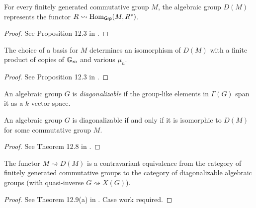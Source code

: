 \begin{proposition}
  \label{DM_func}

  For every finitely generated commutative group $M$, the algebraic group $D(M)$
  represents the functor $R \rightsquigarrow \operatorname{Hom}_{\mathsf{Grp}}(M,R^*)$.
\end{proposition}
\begin{proof}
  See Proposition 12.3 in \cite{Milne_2017}.
\end{proof}


\begin{proposition}
  \label{0-spec-grp-alg-basis}

  The choice of a basis for $M$ determines an isomorphism of $D(M)$
  with a finite product of copies of ${\mathbb G_m}$ and various $\mu_n$.
\end{proposition}
\begin{proof}
  See Proposition 12.3 in \cite{Milne_2017}.
\end{proof}


\begin{definition}
  \label{diag}
  An algebraic group $G$ is \emph{diagonalizable}
  if the group-like elements in $\Gamma(G)$ span it as a $k$-vector space.
\end{definition}

\begin{theorem}
  \label{diag_iff_D}
  An algebraic group $G$ is diagonalizable
  if and only if it is isomorphic to $D(M)$ for some commutative group $M$.
\end{theorem}
\begin{proof}
  See Theorem 12.8 in \cite{Milne_2017}.
\end{proof}

\begin{theorem}
  \label{congr_fggrp_diag}
  The functor $M\rightsquigarrow D(M)$ is a contravariant equivalence
  from the category of finitely generated commutative groups to the category of
  diagonalizable algebraic groups (with quasi-inverse $G \rightsquigarrow X(G)$).
\end{theorem}
\begin{proof}
  See Theorem 12.9(a) in \cite{Milne_2017}. Case work required.
\end{proof}
